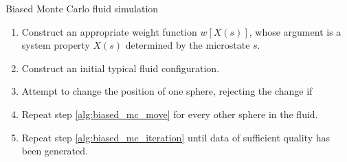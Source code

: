 \documentclass[11pt]{article}
\newcommand{\p}[1]{\left(#1\right)} %
\renewcommand{\sp}[1]{\left[#1\right]} %
\newenvironment{alg}
{\hrulefill\begin{enumerate}}
{\end{enumerate}\hrulefill}
\begin{document}
\begin{algorithm}[tb]
  \caption{Biased Monte Carlo fluid simulation}
  \label{alg:biased_MC}
  \begin{alg}

  \item Construct an appropriate weight function $w\sp{X\p{s}}$, whose
    argument is a system property $X\p{s}$ determined by the
    microstate $s$.

  \item Construct an initial typical fluid configuration.

  \item Attempt to change the position of one sphere, rejecting the
    change if
    \label{alg:biased_mc_move}

  \item Repeat step \ref{alg:biased_mc_move} for every other sphere in
    the fluid.
    \label{alg:biased_mc_iteration}

  \item Repeat step \ref{alg:biased_mc_iteration} until data of
    sufficient quality has been generated.

  \end{alg}
\end{algorithm}
\end{document}
